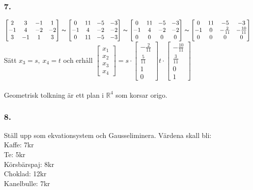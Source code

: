 \documentclass{article}
\begin{document}
\subsubsection*{7.}
$\begin{bmatrix}
2&3&-1&1\\
-1&4&-2&-2\\
3&-1&1&3
\end{bmatrix}\thicksim
\begin{bmatrix}
0&11&-5&-3\\
-1&4&-2&-2\\
0&11&-5&-3
\end{bmatrix}\thicksim
\begin{bmatrix}
0&11&-5&-3\\
-1&4&-2&-2\\
0&0&0&0
\end{bmatrix}\thicksim
\begin{bmatrix}
0&11&-5&-3\\
-1&0&-\frac{2}{11}&-\frac{10}{11}\\
0&0&0&0
\end{bmatrix}
$\\
Sätt $x_3=s,\ x_4=t$ och erhåll $\begin{bmatrix}x_1\\x_2\\x_3\\x_4\end{bmatrix}=s\cdot\begin{bmatrix}-\frac{2}{11}\\\frac{5}{11}\\1\\0\end{bmatrix}t\cdot\begin{bmatrix}-\frac{10}{11}\\\frac{3}{11}\\0\\1\end{bmatrix}$
\\\\
Geometrisk tolkning är ett plan i $\mathbb{R}^4$ som korsar origo.
\subsubsection*{8.}
Ställ upp som ekvationsystem och Gausseliminera. Värdena skall bli:\\
Kaffe: 7kr\\
Te: 5kr\\
Körsbärspaj: 8kr\\
Choklad: 12kr\\
Kanelbulle: 7kr
\end{document}
